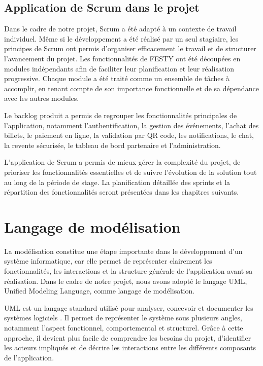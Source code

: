\subsection{Application de Scrum dans le projet}
Dans le cadre de notre projet, Scrum a été adapté à un contexte de travail individuel. Même si le développement a été réalisé par un seul stagiaire, les principes de Scrum ont permis d’organiser efficacement le travail et de structurer l’avancement du projet.
Les fonctionnalités de FESTY ont été découpées en modules indépendants afin de faciliter leur planification et leur réalisation progressive. Chaque module a été traité comme un ensemble de tâches à accomplir, en tenant compte de son importance fonctionnelle et de sa dépendance avec les autres modules.

Le backlog produit a permis de regrouper les fonctionnalités principales de l'application, notamment l'authentification, la gestion des événements, l'achat des billets, le paiement en ligne, la validation par QR code, les notifications, le chat, la revente sécurisée, le tableau de bord partenaire et l'administration.

L'application de Scrum a permis de mieux gérer la complexité du projet, de prioriser les fonctionnalités essentielles et de suivre l'évolution de la solution tout au long de la période de stage. La planification détaillée des sprints et la répartition des fonctionnalités seront présentées dans les chapitres suivants.

\section{Langage de modélisation}

La modélisation constitue une étape importante dans le développement d'un système informatique, car elle permet de représenter clairement les fonctionnalités, les interactions et la structure générale de l'application avant sa réalisation. Dans le cadre de notre projet, nous avons adopté le langage UML, Unified Modeling Language, comme langage de modélisation.

UML est un langage standard utilisé pour analyser, concevoir et documenter les systèmes logiciels \cite{REF-UML}. Il permet de représenter le système sous plusieurs angles, notamment l'aspect fonctionnel, comportemental et structurel. Grâce à cette approche, il devient plus facile de comprendre les besoins du projet, d'identifier les acteurs impliqués et de décrire les interactions entre les différents composants de l'application.

